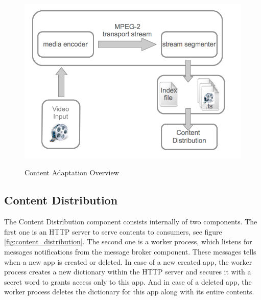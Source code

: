 \begin{figure}[htb]
  \centering
  \includegraphics[scale=0.3]{img/content_adaptation_overview.png}\\
  \caption{Content Adaptation Overview}
  \label{fig:content_adaptation_overview}
\end{figure}

\pagebreak

\subsection{Content Distribution\label{sec:des_cdn}}
The Content Distribution component consists internally of two components. The first one is an \ac{HTTP} server to serve contents to consumers, see figure \ref{fig:content_distribution}. The second one is a worker process, which listens for messages notifications from the message broker component. These messages tells when a new app is created or deleted. In case of a new created app, the worker process creates a new dictionary within the \ac{HTTP} server and secures it with a secret word to grants access only to this app. And in case of a deleted app, the worker process deletes the dictionary for this app along with its entire contents.

